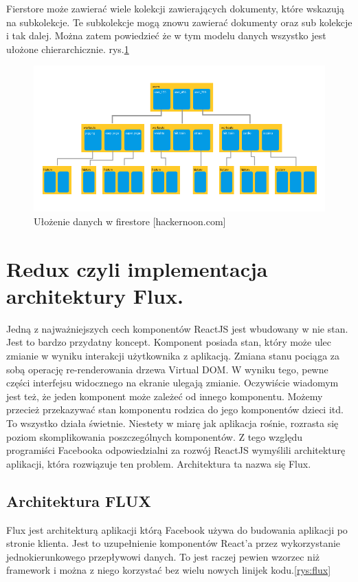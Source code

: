 Fierstore może zawierać wiele kolekcji zawierających dokumenty, które wskazują na subkolekcje.
Te subkolekcje mogą znowu zawierać dokumenty oraz sub kolekcje i tak dalej.
Można zatem powiedzieć że w tym modelu danych wszystko jest ułożone chierarchicznie.\cite{www_hakermoon}
rys.\ref{rys:firestoreTree}

\begin{figure}
	\centering\includegraphics[width=.6\textwidth]{img/firestoreTree}
	\caption{Ułożenie danych w firestore [hackernoon.com]}\label{rys:firestoreTree}%
\end{figure}

\section{Redux czyli implementacja architektury Flux.}

Jedną z najważniejszych cech komponentów ReactJS jest wbudowany w nie stan.
Jest to bardzo przydatny koncept. Komponent posiada stan,
który może ulec zmianie w wyniku interakcji użytkownika z aplikacją.
Zmiana stanu pociąga za sobą operację re-renderowania drzewa Virtual DOM\@.
W wyniku tego, pewne części interfejsu widocznego na ekranie ulegają zmianie.
Oczywiście wiadomym jest też, że jeden komponent może zależeć od innego komponentu.
Możemy przecież przekazywać stan komponentu rodzica do jego komponentów dzieci itd.
To wszystko działa świetnie. Niestety w miarę jak aplikacja rośnie, rozrasta się poziom skomplikowania poszczególnych komponentów.
Z tego względu programiści Facebooka odpowiedzialni za rozwój ReactJS wymyślili architekturę aplikacji, która rozwiązuje ten problem.
Architektura ta nazwa się Flux.\cite{www_nafrontendzie}

\subsection{Architektura FLUX}

Flux jest architekturą aplikacji którą Facebook używa do budowania aplikacji po stronie klienta.
Jest to uzupełnienie komponentów React’a przez wykorzystanie jednokierunkowego przepływowi danych.
To jest raczej pewien wzorzec niż framework i można z niego korzystać  bez wielu nowych linijek kodu.\ref{rys:flux}

